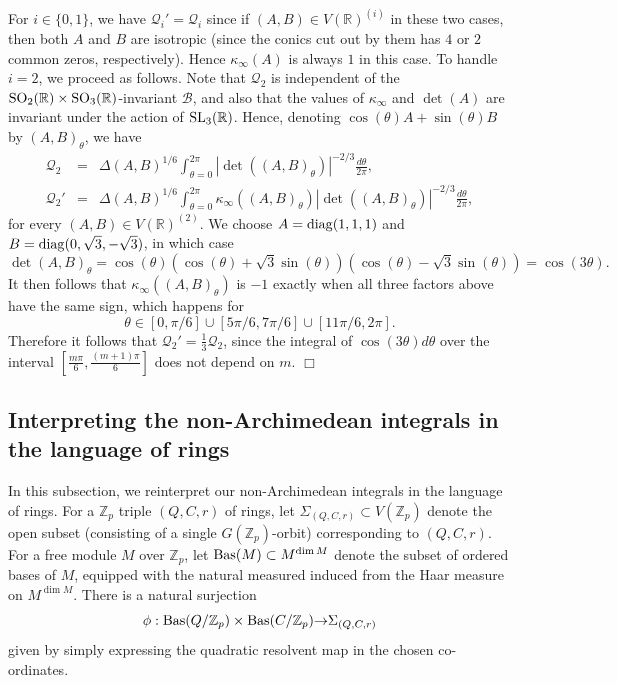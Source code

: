 \documentclass{article}
\def\Z{{\mathbb Z}}
\def\ra{{\rightarrow}}
\def\SL{{\rm SL}}
\def\SO{{\rm SO}}
\def\Bas{{\rm Bas}}
\def\diag{{\rm diag}}
\def\R{{\mathbb R}}
\def\cB{{\mathcal B}}
\def\Z{{\mathbb Z}}
\newenvironment{proof}{\noindent {\bf Proof:}}{$\Box$ \vspace{2 ex}}
\begin{document}
\begin{proof}
For $i\in\{0,1\}$, we have $\mathcal Q_i'=\mathcal Q_i$ since if $(A,B)\in V(\R)^{(i)}$ in these two cases, then both $A$ and $B$ are isotropic (since the conics cut out by them has $4$ or $2$ common zeros, respectively). Hence $\kappa_\infty(A)$ is always $1$ in this case. To handle $i=2$, we proceed as follows. Note that $\mathcal Q_2$ is independent of the $\SO_2(\R)\times\SO_3(\R)$-invariant $\cB$, and also that the values of $\kappa_\infty$ and $\det(A)$ are invariant under the action of $\SL_3(\R)$. Hence, denoting $\cos(\theta)A+\sin(\theta)B$ by $(A,B)_\theta$, we have 
\begin{equation*}
\begin{array}{rcl}
\mathcal Q_2&=&\displaystyle\Delta(A,B)^{1/6}\int_{\theta=0}^{2\pi}|\det((A,B)_\theta)|^{-2/3}\frac{d\theta}{2\pi},
\\[.2in]
\mathcal Q_2'&=&\displaystyle\Delta(A,B)^{1/6}\int_{\theta=0}^{2\pi}\kappa_\infty((A,B)_\theta)|\det((A,B)_\theta)|^{-2/3}\frac{d\theta}{2\pi},
\end{array}
\end{equation*}
for every $(A,B)\in V(\R)^{(2)}$.
We choose $A=\diag(1,1,1)$ and $B=\diag(0,\sqrt{3},-\sqrt{3})$, in which case
$$\det(A,B)_\theta=\cos(\theta)(\cos(\theta)+\sqrt{3}\sin(\theta))(\cos(\theta)-\sqrt{3}\sin(\theta))=\cos(3\theta).$$
It then follows that $\kappa_\infty((A,B)_\theta)$ is $-1$ exactly when all three factors above have the same sign, which happens for 
\begin{equation*}
\theta\in [0,\pi/6]\cup[5\pi/6,7\pi/6]\cup[11\pi/6,2\pi].
\end{equation*}
Therefore it follows that
$\mathcal Q_2'=\frac13 \mathcal Q_2$, since the integral of $\cos(3\theta)d\theta$ over the interval $[\frac{m\pi}{6},\frac{(m+1)\pi}{6}]$ does not depend on $m$.
\end{proof}



\subsection{Interpreting the non-Archimedean integrals in the language of rings}

In this subsection, we reinterpret our non-Archimedean integrals in the language of rings. For a $\Z_p$ triple $(Q,C,r)$ of rings, let $\Sigma_{(Q,C,r)}\subset V(\Z_p)$ denote the open subset (consisting of a single $G(\Z_p)$-orbit) corresponding to $(Q,C,r)$. For a free module $M$ over $\Z_p$, let $\Bas(M)\subset M^{\dim M}$ denote the subset of ordered bases of $M$, equipped with the natural measured induced from the Haar measure on $M^{\dim M}$. There is a natural surjection $$\phi:\Bas(Q/\Z_p)\times \Bas(C/\Z_p)\ra \Sigma_{(Q,C,r)}$$ given by simply expressing the quadratic resolvent map in the chosen co-ordinates. 
\end{document}

